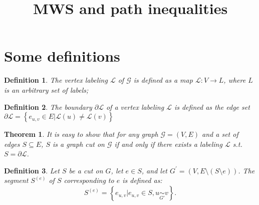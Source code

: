 \documentclass[12pt]{article}
\newtheorem{theorem}{Theorem}[section]
\newtheorem{definition}{Definition}[section]
\begin{document}
 
 
\title{MWS and path inequalities}%
 
\maketitle
\section{Some definitions}

\begin{definition}
The vertex labeling $\mathcal{L}$ of $\mathcal{G}$ is defined as a map $\mathcal{L}: V \rightarrow L $, where $L$ is an arbitrary set of labels;
\end{definition}

\begin{definition}
The \emph{boundary} $\partial \mathcal{L}$ of a vertex labeling $\mathcal{L}$ is defined as the edge set $\partial \mathcal{L} = \left\{ e_{u,v}\in E | \mathcal{L}(u) \neq \mathcal{L}(v)\right\}$
\end{definition}

\begin{theorem}
It is easy to show that for any graph $\mathcal{G}=(V,E)$ and a set of edges $S\subseteq E$, $S$ is a graph cut on $\mathcal{G}$ if and only if there exists a labeling $\mathcal{L}$ s.t. $S=\partial \mathcal{L}$. 
\end{theorem}

\begin{definition}
Let $S$ be a cut on $G$, let $e\in S$,  and let $G^{'}=(V,E\setminus(S\setminus {e}))$. The segment $S^{(e)}$ of $S$ corresponding to $e$ is defined as:
\begin{equation}
S^{(e)} = \left\{ e_{u,v} \big| e_{u,v} \in S, u \underset{G'}{\sim}v   \right\}.
\end{equation}
\end{definition}
\end{document}
